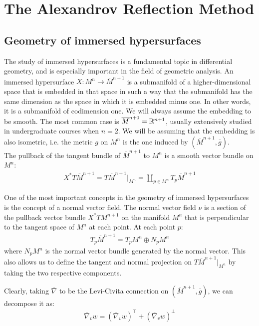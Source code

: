 \chapter{The Alexandrov Reflection Method}

\section{Geometry of immersed hypersurfaces}


The study of immersed hypersurfaces is a fundamental topic in differential geometry, and is especially important in the field of geometric analysis. An immersed hypersurface $X: M^n \rightarrow \overline{M}^{n+1}$ is a submanifold of a higher-dimensional space that is embedded in that space in such a way that the submanifold has the same dimension as the space in which it is embedded minus one. In other words, it is a submanifold of codimension one. We will always assume the embedding to be smooth. The most common case is $\overline{M}^{n+1}=\mathbb{R}^{n+1}$, usually extensively studied in undergraduate courses when $n=2$. We will be assuming that the embedding is also isometric, i.e. the metric $g$ on $M^n$ is the one induced by $(\overline{M}^{n+1}, \overline{g})$. \\
The pullback of the tangent bundle of $\overline{M}^{n+1}$ to
$M^{n}$ is a smooth vector bundle on $M^{n}$:
\begin{align*}
	X^{*}T\overline{M}^{n+1}=T\overline{M}^{n+1}|_{M^n}= \amalg_{p \in M^n} T_p\overline{M}^{n+1}
\end{align*} 

One of the most important concepts in the geometry of immersed hypersurfaces is the concept of a normal vector field. The normal vector field $\nu$ is a section of the pullback vector bundle $X^* TM^{n+1}$ on the manifold $M^n$ that is perpendicular to the tangent space of $M^n$ at each point. At each point $p$:
\begin{align*}
	T_p\overline{M}^{n+1}=T_pM^{n}\oplus N_pM^{n}
\end{align*} 
where $N_pM^{n}$ is the normal vector bundle generated by the normal vector. This also allows us to define the tangent and normal projection on $T\overline{M}^{n+1}|_{M^n}$ by taking the two respective components. 

Clearly, taking $\overline{\nabla}$ to be the Levi-Civita connection on $(\overline{M}^{n+1}, \overline{g})$, we can decompose it as:
\begin{align*}
	\overline{\nabla}_v w = (\overline{\nabla}_v w )^\top +  (\overline{\nabla}_v w )^\bot
\end{align*} 


